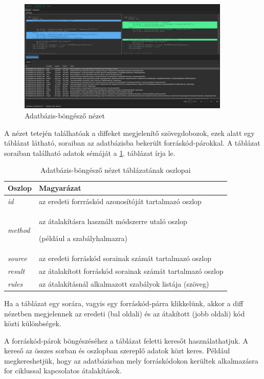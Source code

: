 \begin{figure}[H]
	\centering
	\includegraphics[width=0.9\textwidth]{images/screenshots/database_tab.png}
	\caption{Adatbázis-böngésző nézet}
\end{figure}

A nézet tetején találhatóak a diffeket megjelenítő szövegdobozok, ezek alatt
egy táblázat látható, soraiban az adatbázisba bekerült forráskód-párokkal.
A táblázat soraiban található adatok sémáját a \ref{tab:schema}. táblázat írja le.

\begin{table}[H]
	\centering
	\begin{tabular}{ | m{} | m{} | }
		\hline
		\textbf{Oszlop} & \textbf{Magyarázat} \\
		\hline \hline

		\emph{id}
		& az eredeti forrráskód azonosítóját tartalmazó oszlop \\
		\hline
		
		\emph{method}
		& az átalakításra használt módszerre utaló oszlop
		
		(például a szabályhalmazra) \\
		\hline
		
		\emph{source}
		& az eredeti forráskód sorainak számát tartalmazó oszlop \\
		\hline
		
		\emph{result}
		& az átalakított forráskód sorainak számát tartalmazó oszlop \\
		\hline
		
		\emph{rules}
		& az átalakításnál alkalmazott szabályok listája (szöveg) \\
		\hline
	\end{tabular}
	\caption{Adatbázis-böngésző nézet táblázatának oszlopai}
	\label{tab:schema}
\end{table}

Ha a táblázat egy sorára, vagyis egy forráskód-párra
klikkelünk,
akkor a diff nézetben megjelennek az eredeti (bal oldali) és az átakított (jobb oldali)
kód közti különbségek.

A forráskód-párok böngészéséhez a táblázat feletti keresőt használathatjuk.
A kereső az összes sorban és oszlopban szereplő adatok közt keres.
Például megkereshetjük, hogy az adatbázisban mely forráskódokon kerültek alkalmazásra
for ciklussal kapcsolatos átalakítások.
